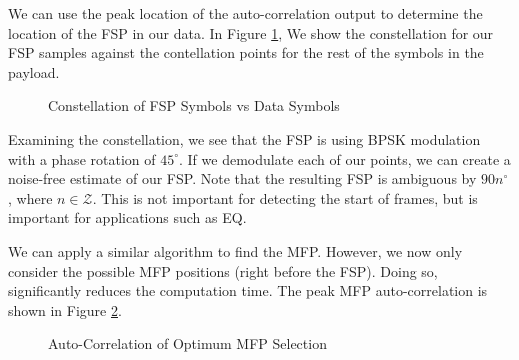 \documentclass[conference,onecolumn]{IEEEtran}
\begin{document}
\noindent We can use the peak location of the auto-correlation output to determine the location of the FSP in our data. In Figure \ref{fig::fsp_constellation}, We show the constellation for our FSP samples against the contellation points for the rest of the symbols in the payload.

\begin{figure}[H]
	\centerline{}
	\caption{Constellation of FSP Symbols vs Data Symbols}
	\label{fig::fsp_constellation}
\end{figure}

\noindent Examining the constellation, we see that the FSP is using BPSK modulation with a phase rotation of $45^{\circ}$. If we demodulate each of our points, we can create a noise-free estimate of our FSP. Note that the resulting FSP is ambiguous by $90n^{\circ}$, where $n \in \mathcal{Z}$. This is not important for detecting the start of frames, but is important for applications such as EQ.

We can apply a similar algorithm to find the MFP. However, we now only consider the possible MFP positions (right before the FSP). Doing so, significantly reduces the computation time. The peak MFP auto-correlation is shown in Figure \ref{fig::mfp_correlation}.

\begin{figure}[H]
	\centerline{}
	\caption{Auto-Correlation of Optimum MFP Selection}
	\label{fig::mfp_correlation}
\end{figure}
\end{document}
